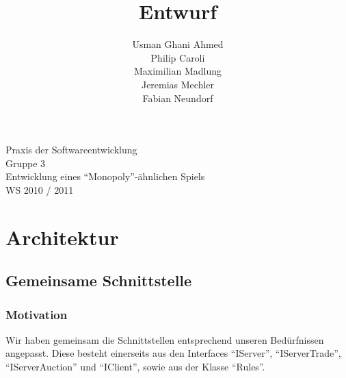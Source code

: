 \documentclass[a4paper,10pt]{article}
\title{Entwurf}
\date{}
\author{Usman Ghani Ahmed \\
Philip Caroli\\
Maximilian Madlung\\ 
Jeremias Mechler\\ 
Fabian Neundorf}
\begin{document}
 
\vspace{5cm}
\maketitle
\begin{center}
\vspace{3cm}
\huge{Praxis der Softwareentwicklung \\
Gruppe 3 \\[0.5cm]
Entwicklung eines "`Monopoly"'-ähnlichen Spiels \\[0.5cm]
WS 2010 / 2011} \\[2cm]
\end{center}

\newpage

\tableofcontents

\newpage

\section{Architektur}

\subsection{Gemeinsame Schnittstelle}
\subsubsection{Motivation}
Wir haben gemeinsam die Schnittstellen entsprechend unseren Bedürfnissen angepasst. Diese besteht einerseits aus den Interfaces "`IServer"', "`IServerTrade"', "`IServerAuction"' und "`IClient"', sowie aus der Klasse "`Rules"'.
\end{document}

